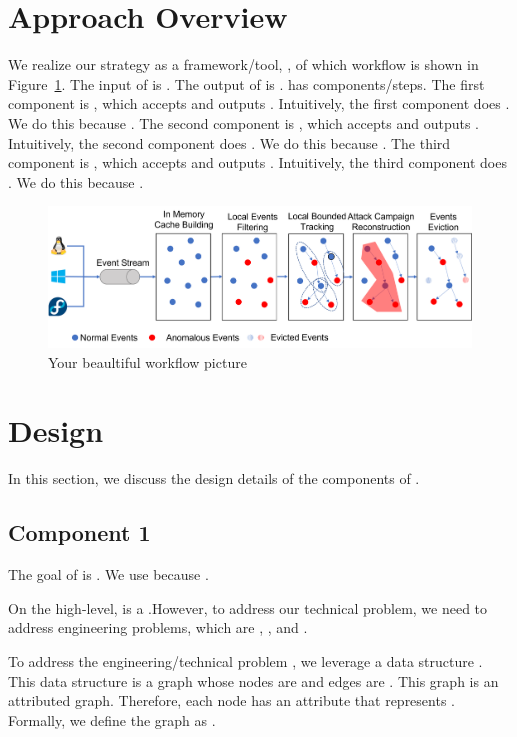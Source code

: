 \section{Approach Overview}
We realize our strategy as a framework/tool, \toolname, of which workflow is shown in Figure~\ref{fig:workflow}. The input of \toolname is \blank{}. The output of \toolname is \blank{}. \toolname has \blank{} components/steps. The first component is \blank{}, which accepts \blank{} and outputs \blank{}. Intuitively, the first component does \blank{}. We do this because \blank{}. The second component is \blank{}, which accepts \blank{} and outputs \blank{}. Intuitively, the second component does \blank{}. We do this because \blank{}. The third component is \blank{}, which accepts \blank{} and outputs \blank{}. Intuitively, the third component does \blank{}. We do this because \blank{}. 

\begin{figure}[t!]
    \centering
    \includegraphics[width=\textwidth]{fig/workflow.png}
	\caption{Your beaultiful workflow picture}
	\label{fig:workflow}
\end{figure}
\section{Design}
In this section, we discuss the design details of the components of \toolname. 
\subsection{Component 1}
The goal of  is \blank{}. We use   because \blank{}. 

On the high-level,  is a \blank{}.However, to address our technical problem, we need to address \blank{} engineering problems, which are \blank{}, \blank{}, and \blank{}. 

To address the engineering/technical problem \blank{}, we leverage a data structure \blank{}. This data structure is a graph whose nodes are \blank{} and edges are \blank{}. This graph is an attributed graph. Therefore, each node has an attribute that represents \blank{}. Formally, we define the graph as .

